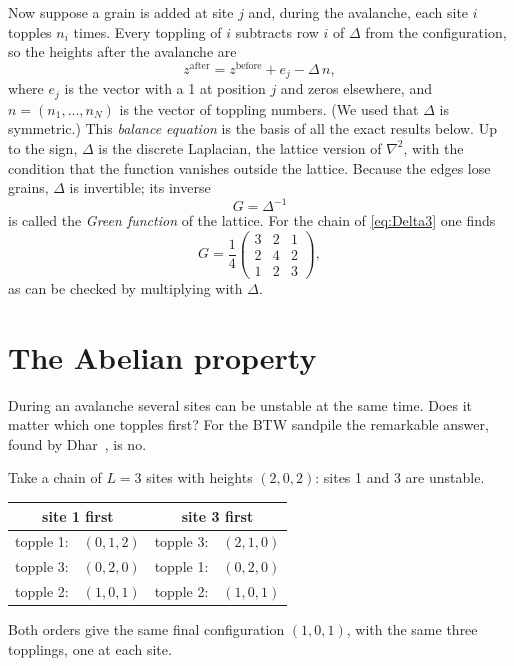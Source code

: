 Now suppose a grain is added at site $j$ and, during the avalanche, each site $i$ topples $n_i$ times. Every toppling
of $i$ subtracts row $i$ of $\Delta$ from the configuration, so the heights after the avalanche are
\begin{equation}
  z^{\text{after}} = z^{\text{before}} + e_j - \Delta\, n ,
  \label{eq:balance}
\end{equation}
where $e_j$ is the vector with a 1 at position $j$ and zeros elsewhere, and $n=(n_1,\dots,n_N)$ is the vector of
toppling numbers. (We used that $\Delta$ is symmetric.) This \emph{balance equation} is the basis of all the exact
results below. Up to the sign, $\Delta$ is the discrete Laplacian, the lattice version of $\nabla^2$, with the
condition that the function vanishes outside the lattice. Because the edges lose grains, $\Delta$ is invertible; its
inverse
\begin{equation}
  G = \Delta^{-1}
\end{equation}
is called the \emph{Green function} of the lattice. For the chain of \cref{eq:Delta3} one finds
\begin{equation}
  G = \frac14\begin{pmatrix} 3 & 2 & 1\\ 2 & 4 & 2 \\ 1 & 2 & 3 \end{pmatrix},
  \label{eq:G3}
\end{equation}
as can be checked by multiplying with $\Delta$.

\section{The Abelian property}
\label{sec:abelian}

During an avalanche several sites can be unstable at the same time. Does it matter which one topples first? For the
BTW sandpile the remarkable answer, found by Dhar~\cite{Dhar1990}, is no.

\begin{example}
Take a chain of $L=3$ sites with heights $(2,0,2)$: sites 1 and 3 are unstable.
\begin{center}
\begin{tabular}{ll@{\qquad}ll}
\toprule
\multicolumn{2}{c}{site 1 first} & \multicolumn{2}{c}{site 3 first} \\
\midrule
topple 1: & $(0,1,2)$ & topple 3: & $(2,1,0)$ \\
topple 3: & $(0,2,0)$ & topple 1: & $(0,2,0)$ \\
topple 2: & $(1,0,1)$ & topple 2: & $(1,0,1)$ \\
\bottomrule
\end{tabular}
\end{center}
Both orders give the same final configuration $(1,0,1)$, with the same three topplings, one at each site.
\end{example}

